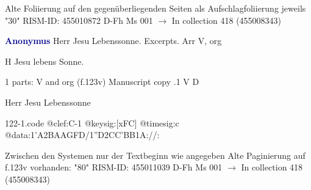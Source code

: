 \documentclass[twocolumn]{book}
\begin{document}
\newline Alte Foliierung auf den gegenüberliegenden Seiten als Aufschlagfoliierung jeweils "30"
\newline RISM-ID: 455010872
\newline D-Fh  Ms 001
\newline $\rightarrow$ In collection 418 (455008343)
      
\newline \par \vspace{7pt} \textcolor{darkblue}{\textbf{Anonymus  }}
\newline Herr Jesu Lebenssonne. Excerpts. Arr
\newline V, org
\newline \begin{itshape} H Jesu lebens Sonne.\end{itshape} 
\newline \textcolor{darkblue}{}  1 parts: V and org  (f.123v)
\newline Manuscript copy
.1  V  D
\newline \begin{footnotesize} Herr Jesu Lebenssonne \end{footnotesize}  
\begin{filecontents*}{122-1.code}
@clef:C-1
@keysig:[xFC]
@timesig:c
@data:1'A2BAAGFD/1''D2CC'BB1A://:
\end{filecontents*}
\newline
%

\newline Zwischen den Systemen nur der Textbeginn wie angegeben
\newline Alte Paginierung auf f.123v vorhanden: "80"
\newline RISM-ID: 455011039
\newline D-Fh  Ms 001
\newline $\rightarrow$ In collection 418 (455008343)
      
\end{document}
